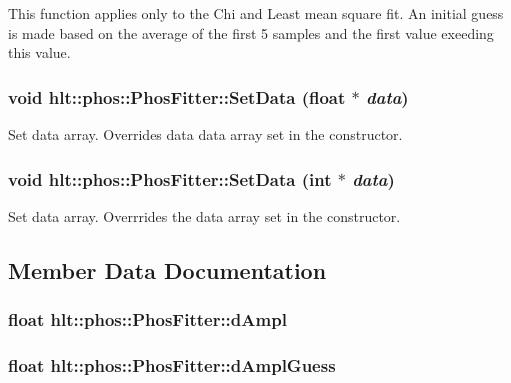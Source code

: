 This function applies only to the Chi and Least mean square fit. An initial guess is made based on the average of the first 5 samples and the first value exeeding this value. 
\subsubsection{\setlength{\rightskip}{0pt plus 5cm}void hlt::phos::Phos\-Fitter::Set\-Data (float $\ast$ {\em data})}\label{classhlt_1_1phos_1_1PhosFitter_a14}


Set data array. Overrides data data array set in the constructor. 
\subsubsection{\setlength{\rightskip}{0pt plus 5cm}void hlt::phos::Phos\-Fitter::Set\-Data (int $\ast$ {\em data})}\label{classhlt_1_1phos_1_1PhosFitter_a13}


Set data array. Overrrides the data array set in the constructor. 

\subsection{Member Data Documentation}
\subsubsection{\setlength{\rightskip}{0pt plus 5cm}float {\bf hlt::phos::Phos\-Fitter::d\-Ampl}\hspace{0.3cm}{\tt  [private]}}\label{classhlt_1_1phos_1_1PhosFitter_r3}


\subsubsection{\setlength{\rightskip}{0pt plus 5cm}float {\bf hlt::phos::Phos\-Fitter::d\-Ampl\-Guess}\hspace{0.3cm}{\tt  [private]}}\label{classhlt_1_1phos_1_1PhosFitter_r5}


